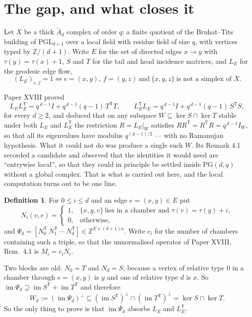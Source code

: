 \documentclass[11pt]{amsart}
\theoremstyle{plain}
\theoremstyle{definition}
\newtheorem{definition}[theorem]{Definition}
\theoremstyle{remark}
\newcommand{\Z}{\mathbb{Z}}
\newcommand{\LE}{L_E}
\newcommand{\PG}{\mathrm{PG}}
\newcommand{\Atilde}[1]{\widetilde A_{#1}}
\newcommand{\im}{\operatorname{im}}
\newcommand{\tp}{\mathsf{T}}
\begin{document}
\section{The gap, and what closes it}

Let $X$ be a thick $\Atilde d$ complex of order $q$: a finite quotient of the Bruhat--Tits
building of $\mathrm{PGL}_{d+1}$ over a local field with residue field of size $q$, with
vertices typed by $\Z/(d+1)$. Write $E$ for the set of directed edges $x\to y$ with
$\tau(y)=\tau(x)+1$, $S$ and $T$ for the tail and head incidence matrices, and $\LE$ for the
geodesic edge flow,
\[
  (\LE)_{e,f}=1 \iff e=(x,y),\ f=(y,z)\ \text{and}\ \{x,y,z\}\ \text{is not a simplex of }X .
\]

Paper XVIII proved
\begin{equation}\label{eq:main}
  \LE\LE^{\tp}=q^{\,d-1}I+q^{\,d-1}(q-1)\,T^{\tp}T,\qquad
  \LE^{\tp}\LE=q^{\,d-1}I+q^{\,d-1}(q-1)\,S^{\tp}S ,
\end{equation}
for every $d\ge 2$, and deduced that on any subspace $W\subseteq\ker S\cap\ker T$ stable
under both $\LE$ and $\LE^{\tp}$ the restriction $R=\LE|_W$ satisfies
$RR^{\tp}=R^{\tp}R=q^{\,d-1}I_W$, so that all its eigenvalues have modulus $q^{(d-1)/2}$ ---
with no Ramanujan hypothesis. What it could not do was produce a single such $W$. Its
Remark 4.1 recorded a candidate and observed that the identities it would need are
``entrywise local'', so that they could in principle be settled inside $\PG(d,q)$ without a
global complex. That is what is carried out here, and the local computation turns out to be
one line.

\begin{definition}\label{def:M}
For $0\le i\le d$ and an edge $e=(x,y)\in E$ put
\[
  N_i(v,e)=
  \begin{cases}1, & \{x,y,v\}\ \text{lies in a chamber and }\tau(v)=\tau(y)+i,\\
               0, & \text{otherwise,}\end{cases}
\]
and $\Psi_d=[N_0^{\tp}\ N_1^{\tp}\ \cdots\ N_d^{\tp}]\in\Z^{E\times(d+1)n}$. Write $c_i$ for
the number of chambers containing such a triple, so that the unnormalised operator of
Paper XVIII, Rem.~4.1 is $M_i=c_iN_i$.
\end{definition}

Two blocks are old: $N_0=T$ and $N_d=S$, because a vertex of relative type $0$ in a chamber
through $e=(x,y)$ is $y$ and one of relative type $d$ is $x$. So
$\im\Psi_d\supseteq\im S^{\tp}+\im T^{\tp}$ and therefore
\begin{equation}\label{eq:inside}
  W_d:=(\im\Psi_d)^{\perp}\subseteq(\im S^{\tp})^{\perp}\cap(\im T^{\tp})^{\perp}
  =\ker S\cap\ker T .
\end{equation}
So the only thing to prove is that $\im\Psi_d$ absorbs $\LE$ and $\LE^{\tp}$.
\end{document}
